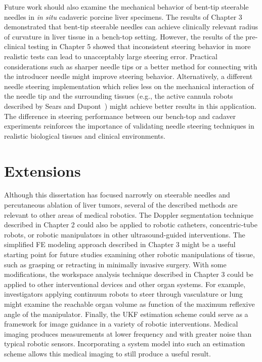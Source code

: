 Future work should also examine the mechanical behavior of bent-tip steerable needles in \textit{in situ} cadaveric porcine liver specimens. The results of Chapter 3 demonstrated that bent-tip steerable needles can achieve clinically relevant radius of curvature in liver tissue in a bench-top setting. However, the results of the pre-clinical testing in Chapter 5 showed that inconsistent steering behavior in more realistic tests can lead to unacceptably large steering error. Practical considerations such as sharper needle tips or a better method for connecting with the introducer needle might improve steering behavior. Alternatively, a different needle steering implementation which relies less on the mechanical interaction of the needle tip and the surrounding tissues (e.g., the active cannula robots described by Sears and Dupont~\cite{Sears2006}) might achieve better results in this application. The difference in steering performance between our bench-top and cadaver experiments reinforces the importance of validating needle steering techniques in realistic biological tissues and clinical environments. 

\section{Extensions}
Although this dissertation has focused narrowly on steerable needles and percutaneous ablation of liver tumors, several of the described methods are relevant to other areas of medical robotics. The Doppler segmentation technique described in Chapter 2 could also be applied to robotic catheters, concentric-tube robots, or robotic manipulators in other ultrasound-guided interventions. The simplified FE modeling approach described in Chapter 3 might be a useful starting point for future studies examining other robotic manipulations of tissue, such as grasping or retracting in minimally invasive surgery. With some modifications, the workspace analysis technique described in Chapter 3 could be applied to other interventional devices and other organ systems. For example, investigators applying continuum robots to steer through vasculature or lung might examine the reachable organ volume as function of the maximum reflexive angle of the manipulator. Finally, the UKF estimation scheme could serve as a framework for image guidance in a variety of robotic interventions. Medical imaging produces measurements at lower frequency and with greater noise than typical robotic sensors. Incorporating a system model into such an estimation scheme allows this medical imaging to still produce a useful result.




